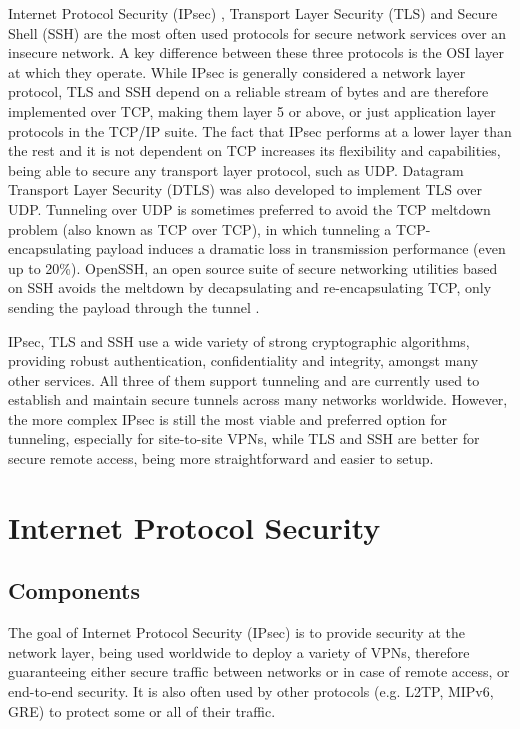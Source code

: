 \documentclass[a4paper,12pt]{report}
\begin{document}
		Internet Protocol Security (IPsec) \cite{rfc6071}, Transport Layer Security (TLS) \cite{rfc8446} and Secure Shell (SSH) \cite{rfc4253} are the most often used protocols for secure network services over an insecure network. A key difference between these three protocols is the OSI layer at which they operate. While IPsec is generally considered a network layer protocol, TLS and SSH depend on a reliable stream of bytes and are therefore implemented over TCP, making them layer 5 or above, or just application layer protocols in the TCP/IP suite. The fact that IPsec performs at a lower layer than the rest and it is not dependent on TCP increases its flexibility and capabilities, being able to secure any transport layer protocol, such as UDP. Datagram Transport Layer Security (DTLS) \cite{rfc6347} was also developed to implement TLS over UDP. Tunneling over UDP is sometimes preferred to avoid the TCP meltdown problem (also known as TCP over TCP), in which tunneling a TCP-encapsulating payload induces a dramatic loss in transmission performance (even up to 20\%)\cite{tcpmeltdown}. OpenSSH, an open source suite of secure networking utilities based on SSH avoids the meltdown by decapsulating and re-encapsulating TCP, only sending the payload through the tunnel \cite{opensshmeltdown}.
		
		IPsec, TLS and SSH use a wide variety of strong cryptographic algorithms, providing robust authentication, confidentiality and integrity, amongst many other services. All three of them support tunneling and are currently used to establish and maintain secure tunnels across many networks worldwide. However, the more complex IPsec is still the most viable and preferred option for tunneling, especially for site-to-site VPNs, while TLS and SSH are better for secure remote access, being more straightforward and easier to setup.
		
	\chapter{Internet Protocol Security}
	\section{Components}
		The goal of Internet Protocol Security (IPsec) is to provide security at the network layer, being used worldwide to deploy a variety of VPNs, therefore guaranteeing either secure traffic between networks or in case of remote access, or end-to-end security. It is also often used by other protocols (e.g. L2TP, MIPv6, GRE) to protect some or all of their traffic.
		
\end{document}
